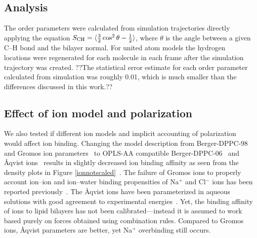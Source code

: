 \documentclass[pre,aps,floatfix,authordate1-4,twocolumn]{revtex4-1}
\begin{document}
\subsection{Analysis}
The order parameters were calculated from simulation trajectories directly applying the equation
$S_{{\rm CH}}=\langle \frac{3}{2}  \cos^2 \theta-\frac{1}{2} \rangle$,
where $\theta$ is the angle between a given C--H bond and the bilayer normal.
 For united atom models the hydrogen locations
were regenerated for each molecule in each frame after the simulation trajectory was created.
??The statistical error estimate for each order parameter calculated from simulation was roughly
0.01, which is much smaller than the differences discussed in this work.??

\subsection{Effect of ion model and polarization}

 We also tested if different ion models and implicit accounting of polarization would affect ion binding.
 Changing the model description from Berger-DPPC-98~\cite{Marrink98} and Gromos ion
 parameters~\cite{??} to OPLS-AA compatible
 Berger-DPPC-06~\cite{tieleman06} and \r{A}qvist ions~\cite{Aaqvist90} results in slightly decreased ion binding affinity
 as seen from the density plots in Figure \ref{ionnotscaled}~\cite{DPPCBergerNaCl, DPPCBergerOPLS06NaCl}. The failure
 of Gromos ions to properly account ion--ion and ion--water binding propensities of Na$^+$ and Cl$^-$ ions has been
 reported previously~\cite{Reif13}. The \r{A}qvist ions have been parameterized in aqueous solutions with good agreement
 to experimental energies~\cite{Aaqvist90}. Yet, the binding affinity of ions to lipid bilayers has not been
 calibrated---instead it is assumed to work based purely on forces obtained using combination rules. Compared to Gromos
 ions, \r{A}qvist parameters are better, yet Na$^+$ overbinding still occurs.
\end{document}
